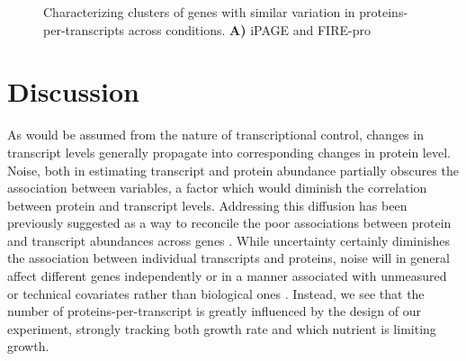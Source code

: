
\begin{figure}[h!]
\begin{center}
\hspace{1mm}
\caption[Characterizing clusters of genes with similar variation in proteins-per-transcripts across conditions]{Characterizing clusters of genes with similar variation in proteins-per-transcripts across conditions. \textbf{A)} 
iPAGE and FIRE-pro}
\label{ch-pta:fire_page}
\end{center}
\end{figure}


\section{Discussion}

As would be assumed from the nature of transcriptional control, changes in transcript levels generally propagate into corresponding changes in protein level.  Noise, both in estimating transcript and protein abundance partially obscures the association between variables, a factor which would diminish the correlation between protein and transcript levels. Addressing this diffusion has been previously suggested as a way to reconcile the poor associations between protein and transcript abundances across genes \cite{Csardi:2015kx}.  While uncertainty certainly diminishes the association between individual transcripts and proteins, noise will in general affect different genes independently or in a manner associated with unmeasured or technical covariates rather than biological ones \cite{Leek:2007kn}. Instead, we see that the number of proteins-per-transcript is greatly influenced by the design of our experiment, strongly tracking both growth rate and which nutrient is limiting growth.

